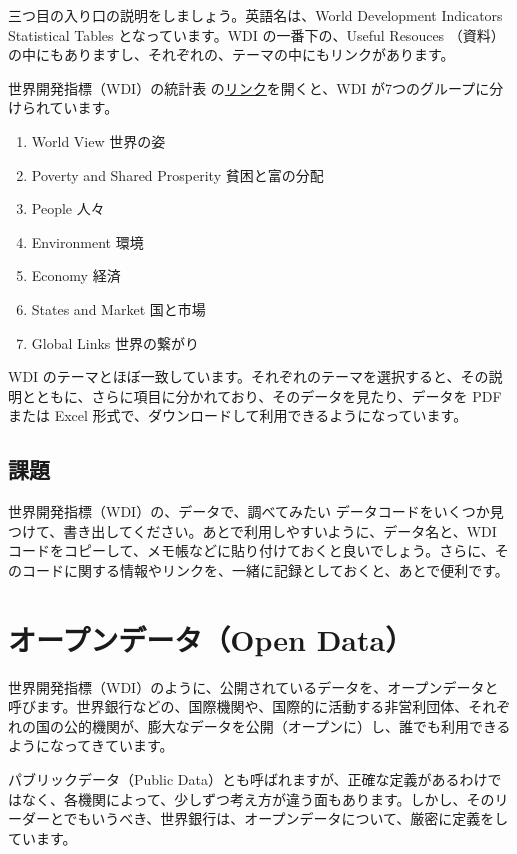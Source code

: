 \documentclass[
  xelatex, ja=standard]{bxjsbook}
\theoremstyle{definition}
\theoremstyle{definition}
\theoremstyle{definition}
\theoremstyle{definition}
\theoremstyle{remark}
\begin{document}
三つ目の入り口の説明をしましょう。英語名は、World Development Indicators Statistical Tables となっています。WDI の一番下の、Useful Resouces （資料）の中にもありますし、それぞれの、テーマの中にもリンクがあります。

世界開発指標（WDI）の統計表 の\href{http://wdi.worldbank.org/tables}{リンク}を開くと、WDI が7つのグループに分けられています。

\begin{enumerate}
\def\labelenumi{\arabic{enumi}.}
\item
  World View 世界の姿
\item
  Poverty and Shared Prosperity 貧困と富の分配
\item
  People 人々
\item
  Environment 環境
\item
  Economy 経済
\item
  States and Market 国と市場
\item
  Global Links 世界の繋がり
\end{enumerate}

WDI のテーマとほぼ一致しています。それぞれのテーマを選択すると、その説明とともに、さらに項目に分かれており、そのデータを見たり、データを PDF または Excel 形式で、ダウンロードして利用できるようになっています。

\hypertarget{ux8ab2ux984c}{%
\subsection{課題}\label{ux8ab2ux984c}}

世界開発指標（WDI）の、データで、調べてみたい データコードをいくつか見つけて、書き出してください。あとで利用しやすいように、データ名と、WDI コードをコピーして、メモ帳などに貼り付けておくと良いでしょう。さらに、そのコードに関する情報やリンクを、一緒に記録としておくと、あとで便利です。

\hypertarget{ux30aaux30fcux30d7ux30f3ux30c7ux30fcux30bfopen-data}{%
\section{オープンデータ（Open Data）}\label{ux30aaux30fcux30d7ux30f3ux30c7ux30fcux30bfopen-data}}

世界開発指標（WDI）のように、公開されているデータを、オープンデータと呼びます。世界銀行などの、国際機関や、国際的に活動する非営利団体、それぞれの国の公的機関が、膨大なデータを公開（オープンに）し、誰でも利用できるようになってきています。

パブリックデータ（Public Data）とも呼ばれますが、正確な定義があるわけではなく、各機関によって、少しずつ考え方が違う面もあります。しかし、そのリーダーとでもいうべき、世界銀行は、オープンデータについて、厳密に定義をしています。
\end{document}
